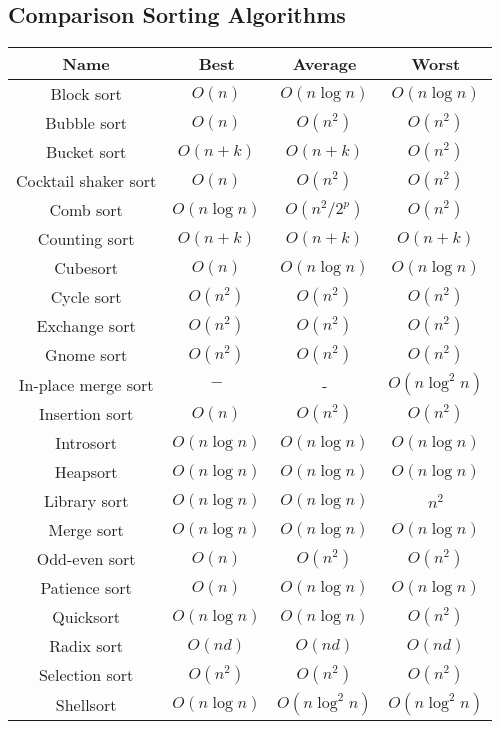\documentclass{article}
\begin{document}
\subsection*{Comparison Sorting Algorithms}

\begin{table}[ht]
	\centering
	\scriptsize
	\begin{tabular}{cccc}
		\textbf{Name} & \textbf{Best}& \textbf{Average} & \textbf{Worst}\\
		\hline
		Block sort & $O(n)$ & $O(n\log{n})$ & $O(n\log{n})$ \\
		Bubble sort & $O(n)$ & $O(n^2)$ & $O(n^2)$ \\
		Bucket sort\footnotemark[10] & $O(n+k)$ & $O(n+k)$ & $O(n^2)$ \\
		Cocktail shaker sort & $O(n)$ & $O(n^2)$ & $O(n^2)$ \\
		Comb sort\footnotemark[11] & $O(n\log{n})$ & $O(n^2/2^p)$ & $O(n^2)$ \\
		Counting sort\footnotemark[12] & $O(n+k)$ & $O(n+k)$ & $O(n+k)$ \\
		Cubesort & $O(n)$ & $O(n\log{n})$ & $O(n\log{n})$ \\
		Cycle sort & $O(n^2)$ & $O(n^2)$ & $O(n^2)$ \\
		Exchange sort & $O(n^2)$ & $O(n^2)$ & $O(n^2)$ \\
		Gnome sort & $O(n^2)$ & $O(n^2)$ & $O(n^2)$ \\
		In-place merge sort & $ - $ & - & $O(n\log^2{n})$ \\
		Insertion sort &$O(n)$ & $O(n^2)$ & $O(n^2)$ \\
		Introsort & $O(n\log{n})$ & $O(n\log{n})$ & $O(n\log{n})$ \\
		Heapsort & $O(n\log{n})$ & $O(n\log{n})$ & $O(n\log{n})$ \\
		Library sort & $O(n\log{n})$ & $O(n\log{n})$ & $n^2$ \\
		Merge sort & $O(n\log{n})$ & $O(n\log{n})$ & $O(n\log{n})$ \\
		Odd-even sort & $O(n)$ & $O(n^2)$ & $O(n^2)$ \\
		Patience sort & $O(n)$ & $O(n\log{n})$ & $O(n\log{n})$ \\
		Quicksort & $O(n\log{n})$ & $O(n\log{n})$ & $O(n^2)$ \\
		Radix sort\footnotemark[13] & $O(nd)$ & $O(nd)$ & $O(nd)$ \\
		Selection sort & $O(n^2)$ & $O(n^2)$ & $O(n^2)$\\
		Shellsort & $O(n \log{n})$& $O(n \log^2{n})$ & $O(n \log^2{n})$ \\

\end{tabular}
\end{table}
\end{document}
